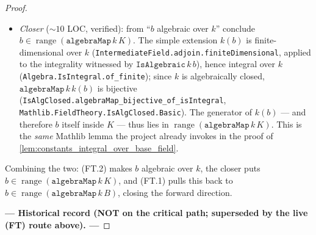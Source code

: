 \begin{proof}
\begin{itemize}
\begin{itemize}
      \item \emph{Closer} (\({\sim}10\) LOC, verified): from ``\(b\) algebraic over \(k\)'' conclude \(b \in \operatorname{range}(\mathtt{algebraMap}\,k\,K)\). The simple extension \(k(b)\) is finite-dimensional over \(k\) (\texttt{IntermediateField.adjoin.finiteDimensional}, applied to the integrality witnessed by \(\mathtt{IsAlgebraic}\,k\,b\)), hence integral over \(k\) (\texttt{Algebra.IsIntegral.of\_finite}); since \(k\) is algebraically closed, \(\mathtt{algebraMap}\,k\,k(b)\) is bijective (\texttt{IsAlgClosed.algebraMap\_bijective\_of\_isIntegral}, \texttt{Mathlib.FieldTheory.IsAlgClosed.Basic}). The generator of \(k(b)\) --- and therefore \(b\) itself inside \(K\) --- thus lies in \(\operatorname{range}(\mathtt{algebraMap}\,k\,K)\). This is the \emph{same} Mathlib lemma the project already invokes in the proof of \cref{lem:constants_integral_over_base_field}.
    \end{itemize}
    Combining the two: (FT.2) makes \(b\) algebraic over \(k\), the closer puts \(b \in \operatorname{range}(\mathtt{algebraMap}\,k\,K)\), and (FT.1) pulls this back to \(b \in \operatorname{range}(\mathtt{algebraMap}\,k\,B)\), closing the forward direction.
  \end{itemize}

  \medskip
  \noindent\textbf{--- Historical record (NOT on the critical path; superseded by the live (FT) route above). ---}
  \medskip


\end{proof}
